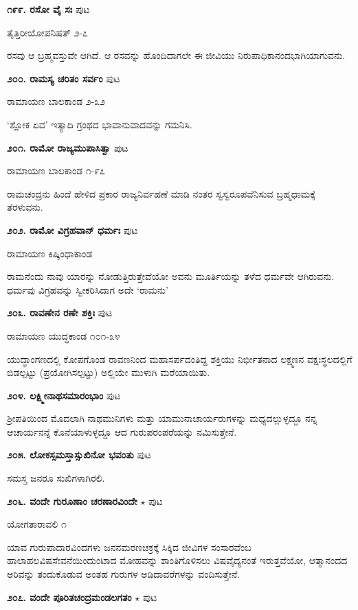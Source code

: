 {\medskip
\noindent\textbf{೧೯೯. ರಸೋ ವೈ ಸಃ} \hfill ಪುಟ \pageref{76}

\hfill ತೈತ್ತಿರೀಯೋಪನಿಷತ್ ೨-೭

ರಸವು ಆ ಬ್ರಹ್ಮವಸ್ತುವೇ ಆಗಿದೆ. ಆ ರಸವನ್ನು ಹೊಂದಿದಾಗಲೇ ಈ ಜೀವಿಯು ನಿರುಪಾಧಿಕಾನಂದಭಾಗಿಯಾಗುವನು.

\medskip
\noindent\textbf{೨೦೦. ರಾಮಸ್ಯ ಚರಿತಂ ಸರ್ವಂ} \hfill ಪುಟ \pageref{204}

\hfill ರಾಮಾಯಣ ಬಾಲಕಾಂಡ ೨-೩೨

`ಶ್ಲೋಕ ಏವ' ಇತ್ಯಾದಿ ಗ್ರಂಥದ ಭಾವಾನುವಾದವನ್ನು ಗಮನಿಸಿ.

\medskip
\noindent\textbf{೨೦೧. ರಾಮೋ ರಾಜ್ಯಮುಪಾಸಿತ್ವಾ} \hfill ಪುಟ \pageref{253}

\hfill ರಾಮಾಯಣ ಬಾಲಕಾಂಡ ೧-೯೭

ರಾಮಚಂದ್ರನು ಹಿಂದೆ ಹೇಳಿದ ಪ್ರಕಾರ ರಾಜ್ಯನಿರ್ವಹಣೆ ಮಾಡಿ ನಂತರ ಸ್ವಸ್ವರೂಪವೆನಿಸುವ ಬ್ರಹ್ಮಧಾಮಕ್ಕೆ ತೆರಳುವನು.

\medskip
\noindent\textbf{೨೦೨. ರಾಮೋ ವಿಗ್ರಹವಾನ್ ಧರ್ಮಃ} \hfill ಪುಟ \pageref{247}

\hfill ರಾಮಾಯಣ ಕಿಷ್ಕಿಂಧಾಕಾಂಡ

ರಾಮನೆಂದು ನಾವು ಯಾರನ್ನು ನೋಡುತ್ತಿರುತ್ತೇವೆಯೋ ಅವನು ಮೂರ್ತಿಯನ್ನು ತಳೆದ ಧರ್ಮವೇ ಆಗಿರುವನು. ಧರ್ಮವು ವಿಗ್ರಹವನ್ನು ಸ್ವೀಕರಿಸಿದಾಗ ಅದೇ `ರಾಮನು'

\medskip
\noindent\textbf{೨೦೩. ರಾವಣೇನ ರಣೇ ಶಕ್ತಿಃ} \hfill ಪುಟ \pageref{120}

\hfill ರಾಮಾಯಣ ಯುದ್ಧಕಾಂಡ ೧೦೧-೩೪

ಯುದ್ಧಾಂಗಣದಲ್ಲಿ ಕೋಪಗೊಂಡ ರಾವಣನಿಂದ ಮಹಾಸರ್ಪದಂತಿದ್ದ ಶಕ್ತಿಯು ನಿರ್ಭೀತನಾದ ಲಕ್ಷ್ಮಣನ ವಕ್ಷಃಸ್ಥಲದಲ್ಲಿಗೆ ಬಿಡಲ್ಪಟ್ಟು (ಪ್ರಯೋಗಿಸಲ್ಪಟ್ಟು) ಅಲ್ಲಿಯೇ ಮುಳುಗಿ ಮರೆಯಾಯಿತು.

\medskip
\noindent\textbf{೨೦೪. ಲಕ್ಷ್ಮೀನಾಥಸಮಾರಂಭಾಂ} \hfill ಪುಟ \pageref{48}

\hfill ಶ್ರೀಪತಿಯಿಂದ ಮೊದಲಾಗಿ ನಾಥಮುನಿಗಳು ಮತ್ತು ಯಾಮುನಾಚಾರ್ಯರುಗಳನ್ನು ಮಧ್ಯದಲ್ಲುಳ್ಳದ್ದೂ ನನ್ನ ಆಚಾರ್ಯನನ್ನೆ ಕೊನೆಯಾಳುಳ್ಳದ್ದೂ ಆದ ಗುರುಪರಂಪರೆಯನ್ನು ನಮಿಸುತ್ತೇನೆ.

\medskip
\noindent\textbf{೨೦೫. ಲೋಕಸ್ಸಮಸ್ತಾಸ್ಸುಖಿನೋ ಭವಂತು} \hfill ಪುಟ \pageref{193}

\hfill ಸಮಸ್ತ ಜನರೂ ಸುಖಿಗಳಾಗಿರಲಿ.

\medskip
\noindent\textbf{೨೦೬. ವಂದೇ ಗುರೂಣಾಂ ಚರಣಾರವಿಂದೇ} $\star$ \hfill ಪುಟ \pageref{180}

\hfill ಯೋಗತಾರಾವಲಿ ೧

ಯಾವ ಗುರುಪಾದಾರವಿಂದಗಳು ಜನನಮರಣಚಕ್ರಕ್ಕೆ  ಸಿಕ್ಕಿದ ಜೀವಿಗಳ ಸಂಸಾರವೆಂಬ ಹಾಲಾಹಲವಿಷಸೇವನೆಯಿಂದುಂಟಾದ ಮೋಹವನ್ನು ಶಾಂತಿಗೊಳಿಸಲು ವಿಷವೈದ್ಯನಂತೆ ಇರುತ್ತವೆಯೋ, ಆತ್ಮಾನಂದದ ಅರಿವನ್ನು ತಂದುಕೊಡುವ ಅಂತಹ ಗುರುಗಳ ಅಡಿದಾವರೆಗಳನ್ನು ವಂದಿಸುತ್ತೇನೆ.

\medskip
\noindent\textbf{೨೦೭. ವಂದೇ ಪೂರಿತಚಂದ್ರಮಂಡಲಗತಂ} $\star$ \hfill ಪುಟ \pageref{32}

}
